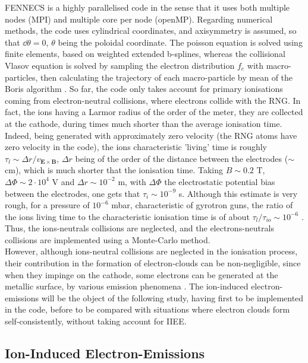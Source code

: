 \noindent FENNECS is a highly parallelised code in the sense that it uses both multiple nodes (MPI) and multiple core per node (openMP). Regarding numerical methods, the code uses cylindrical coordinates, and axisymmetry is assumed, so that $\dd \theta = 0$, $\theta$ being the poloidal coordinate. The poisson equation is solved using finite elements, based on weighted extended b-splines, whereas the collisional Vlasov equation is solved by sampling the electron distribution $f_e$ with macro-particles, then calculating the trajectory of each macro-particle by mean of the Boris algorithm \cite{lebars_et_al, BorisAlg}. So far, the code only takes account for primary ionisations coming from electron-neutral collisions, where electrons collide with the RNG. In fact, the ions having a Larmor radius of the order of the meter, they are collected at the cathode, during times much shorter than the average ionisation time. Indeed, being generated with approximately zero velocity (the RNG atoms have zero velocity in the code), the ions characteristic 'living' time is roughly $\tau_l \sim \Delta r/ v_{\mathbf{E}\times \mathbf{B}}$, $\Delta r$ being of the order of the distance between the electrodes ($\sim$cm), which is much shorter that the ionisation time. Taking $B\sim0.2$ T, $\Delta\Phi \sim 2\cdot 10^4$ V and $\Delta r \sim 10^{-2}$ m, with $\Delta \Phi$ the electrostatic potential bias between the electrodes, one gets that $\tau_i \sim 10^{-9}$ s. Although this estimate is very rough, for a pressure of $10^{-6}$ mbar, characteristic of gyrotron guns, the ratio of the ions living time to the characteristic ionisation time is of about $\tau_l/\tau_{io}\sim 10^{-6}$ \cite{lebars_et_al}. Thus, the ions-neutrals collisions are neglected, and the electrons-neutrals collisions are implemented using a Monte-Carlo method.\\

\noindent However, although ions-neutral collisions are neglected in the ionisation process, their contribution in the formation of electron-clouds can be non-negligible, since when they impinge on the cathode, some electrons can be generated at the metallic surface, by various emission phenomena \cite{baragiola}. The ion-induced electron-emissions will be the object of the following study, having first to be implemented in the code, before to be compared with situations where electron clouds form self-consistently, without taking account for IIEE.
    
\subsection{Ion-Induced Electron-Emissions}

